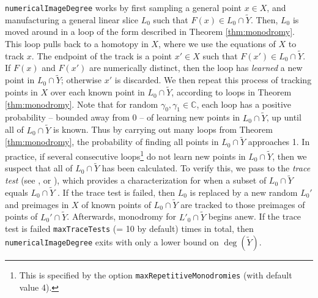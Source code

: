 \documentclass[letter]{amsart}
\theoremstyle{definition}
\begin{document}
\texttt{numericalImageDegree} works by first sampling a general point $x \in X$, and manufacturing a general linear slice $L_0$ such that $F(x) \in L_0 \cap \widetilde{Y}$. Then, $L_0$ is moved around in a loop of the form described in Theorem \ref{thm:monodromy}.  This loop pulls back to a homotopy in $X$, where we use the equations of $X$ to track $x$.  The endpoint of the track is a point $x' \in X$ such that $F(x') \in L_0 \cap \widetilde{Y}$.  If $F(x)$ and $F(x')$ are numerically distinct, then the loop has \textit{learned} a new point in $L_0 \cap \widetilde{Y}$; otherwise $x'$ is discarded. We then repeat this process of tracking points in $X$ over each known point in $L_0 \cap \widetilde{Y}$, according to loops in Theorem \ref{thm:monodromy}.  
Note that for random $\gamma_0, \gamma_1 \in {\mathbb{C}}$, each loop has a positive probability -- bounded away from 0 -- of learning new points in $L_0 \cap \widetilde{Y}$, up until all of $L_0 \cap \widetilde{Y}$ is known.
Thus by carrying out many loops from Theorem \ref{thm:monodromy}, the probability of finding all points in $L_0 \cap \widetilde{Y}$ approaches 1.  In practice, if several consecutive loops\footnote{This is specified by the option \texttt{maxRepetitiveMonodromies} (with default value 4).} do not learn new points in $L_0 \cap \widetilde{Y}$, then we suspect that all of $L_0 \cap \widetilde{Y}$ has been calculated. To verify this, we pass to the \textit{trace test} (see \cite[Corollary 2.2]{SVW}, \cite[\S 5]{HR} or \cite[\S 1]{LS}), which provides a characterization for when a subset of $L_0 \cap \widetilde{Y}$ equals $L_0 \cap \widetilde{Y}$ . If the trace test is failed, then $L_0$ is replaced by a new random $L_0'$ and preimages in $X$ of known points of $L_0 \cap \widetilde{Y}$ are tracked to those preimages of points of $L_0' \cap \widetilde{Y}$.  Afterwards, monodromy for $L'_0 \cap \widetilde{Y}$ begins anew.  If the trace test is failed \texttt{maxTraceTests} (= 10 by default) times in total, then \texttt{numericalImageDegree} exits with only a lower bound on $\deg(\widetilde{Y})$.  
\end{document}

